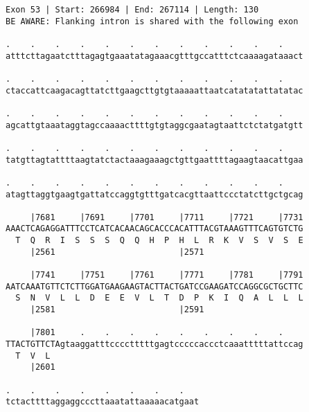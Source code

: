 \documentclass{article}
\begin{document}
\begin{Verbatim}
Exon 53 | Start: 266984 | End: 267114 | Length: 130
BE AWARE: Flanking intron is shared with the following exon
 
.    .    .    .    .    .    .    .    .    .    .    .    
atttcttagaatctttagagtgaaatatagaaacgtttgccatttctcaaaagataaact
  
.    .    .    .    .    .    .    .    .    .    .    .    
ctaccattcaagacagttatcttgaagcttgtgtaaaaattaatcatatatattatatac
  
.    .    .    .    .    .    .    .    .    .    .    .    
agcattgtaaataggtagccaaaacttttgtgtaggcgaatagtaattctctatgatgtt
  
.    .    .    .    .    .    .    .    .    .    .    .    
tatgttagtattttaagtatctactaaagaaagctgttgaattttagaagtaacattgaa
  
.    .    .    .    .    .    .    .    .    .    .    .    
atagttaggtgaagtgattatccaggtgtttgatcacgttaattccctatcttgctgcag
  
     |7681     |7691     |7701     |7711     |7721     |7731
AAACTCAGAGGATTTCCTCATCACAACAGCACCCACATTTACGTAAAGTTTCAGTGTCTG
  T  Q  R  I  S  S  S  Q  Q  H  P  H  L  R  K  V  S  V  S  E
     |2561                         |2571                    
  
     |7741     |7751     |7761     |7771     |7781     |7791
AATCAAATGTTCTCTTGGATGAAGAAGTACTTACTGATCCGAAGATCCAGGCGCTGCTTC
  S  N  V  L  L  D  E  E  V  L  T  D  P  K  I  Q  A  L  L  L
     |2581                         |2591                    
  
     |7801     .    .    .    .    .    .    .    .    .    
TTACTGTTCTAgtaaggatttcccctttttgagtcccccaccctcaaatttttattccag
  T  V  L                                                   
     |2601                                                  
  
.    .    .    .    .    .    .    .   
tctacttttaggaggcccttaaatattaaaaacatgaat
\end{Verbatim}
\newpage
\end{document}
